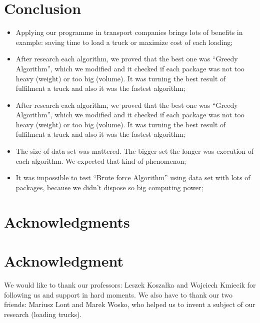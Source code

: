\documentclass[conference,compsoc]{IEEEtran}
\begin{document}
\section{Conclusion}
\begin{itemize}
\item Applying our programme in transport companies brings lots of benefits in example: saving time to load a truck or maximize cost of each loading;

\item After research each algorithm, we proved that the best one was “Greedy Algorithm”, which we modified and it checked if each package was not too heavy (weight) or too big (volume). It was turning the best result of fulfilment a truck and also it was the fastest algorithm;

\item After research each algorithm, we proved that the best one was “Greedy Algorithm”, which we modified and it checked if each package was not too heavy (weight) or too big (volume). It was turning the best result of fulfilment a truck and also it was the fastest algorithm;

\item The size of data set was mattered. The bigger set the longer was execution of each algorithm. We expected that kind of phenomenon;

\item It was impossible to test “Brute force Algorithm” using data set with lots of packages, because we didn't dispose so big computing power;

\end{itemize}




\ifCLASSOPTIONcompsoc
  \section*{Acknowledgments}
\else
  \section*{Acknowledgment}
\fi

We would like to thank our professors: Leszek Koszalka and Wojciech Kmiecik for following us and support in hard moments. We also have to thank our two friends: Mariusz Lont and Marek Wosko, who helped us to invent a subject of our research (loading trucks). 
\end{document}
